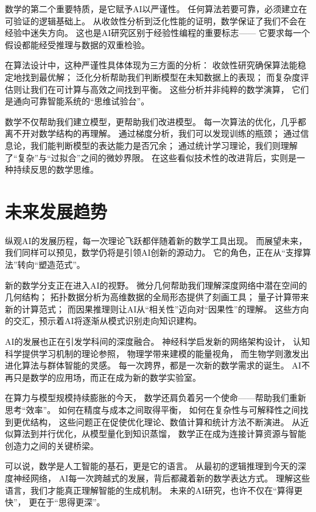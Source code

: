 数学的第二个重要特质，是它赋予AI以严谨性。  
任何算法若要可靠，必须建立在可验证的逻辑基础上。  
从收敛性分析到泛化性能的证明，数学保证了我们不会在经验中迷失方向。  
这也是AI研究区别于经验性编程的重要标志——  
它要求每一个假设都能经受推理与数据的双重检验。

在算法设计中，这种严谨性具体体现为三方面的分析：  
收敛性研究确保算法能稳定地找到最优解；  
泛化分析帮助我们判断模型在未知数据上的表现；  
而复杂度评估则让我们在可计算与高效之间找到平衡。  
这些分析并非纯粹的数学演算，  
它们是通向可靠智能系统的“思维试验台”。

数学不仅帮助我们建立模型，更帮助我们改进模型。  
每一次算法的优化，几乎都离不开对数学结构的再理解。  
通过梯度分析，我们可以发现训练的瓶颈；  
通过信息论，我们能判断模型的表达能力是否冗余；  
通过统计学习理论，我们则理解了“复杂”与“过拟合”之间的微妙界限。  
在这些看似技术性的改进背后，实则是一种持续反思的数学思维。

\section{未来发展趋势}

纵观AI的发展历程，每一次理论飞跃都伴随着新的数学工具出现。  
而展望未来，我们同样可以预见，数学仍将是引领AI创新的源动力。  
它的角色，正在从“支撑算法”转向“塑造范式”。

新的数学分支正在进入AI的视野。  
微分几何帮助我们理解深度网络中潜在空间的几何结构；  
拓扑数据分析为高维数据的全局形态提供了刻画工具；  
量子计算带来新的计算范式；  
而因果推理则让AI从“相关性”迈向对“因果性”的理解。  
这些方向的交汇，预示着AI将逐渐从模式识别走向知识建构。

AI的发展也正在引发学科间的深度融合。  
神经科学启发新的网络架构设计，  
认知科学提供学习机制的理论参照，  
物理学带来建模的能量视角，  
而生物学则激发出进化算法与群体智能的灵感。  
每一次跨界，都是一次新的数学需求的诞生。  
AI不再只是数学的应用场，而正在成为新的数学实验室。

在算力与模型规模持续膨胀的今天，  
数学还肩负着另一个使命——帮助我们重新思考“效率”。  
如何在精度与成本之间取得平衡，  
如何在复杂性与可解释性之间找到更优结构，  
这些问题正在促使优化理论、数值计算和统计方法不断演进。  
从近似算法到并行优化，从模型量化到知识蒸馏，  
数学正在成为连接计算资源与智能创造力之间的关键桥梁。

可以说，数学是人工智能的基石，更是它的语言。  
从最初的逻辑推理到今天的深度神经网络，  
AI每一次跨越式的发展，背后都藏着新的数学表达方式。  
理解这些语言，我们才能真正理解智能的生成机制。  
未来的AI研究，也许不仅在“算得更快”，  
更在于“思得更深”。

